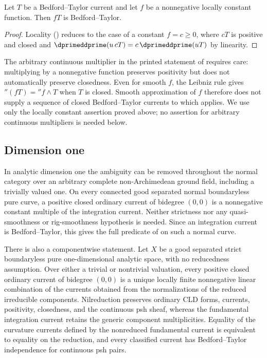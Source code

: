 \begin{corollary}
\label{cor:ch16-bt-times-function}
Let $T$ be a Bedford--Taylor current and let $f$ be a nonnegative locally
constant function.  Then $fT$ is Bedford--Taylor.
\end{corollary}

\begin{proof}
Locality () reduces to the case of a
constant $f=c\geq0$, where $cT$ is positive and closed and
$\dprimeddprime(u\,cT)=c\,\dprimeddprime(uT)$ by linearity.
\end{proof}

The arbitrary continuous multiplier in the printed statement of
\cite[Corollary~8.6.7]{CLD25} requires care: multiplying by a nonnegative
function preserves positivity but does not automatically preserve
closedness.  Even for smooth $f$, the Leibniz rule gives
$\dprime(fT)=\dprime f\wedge T$ when $T$ is closed.  Smooth approximation
of $f$ therefore does not supply a sequence of closed Bedford--Taylor
currents to which  applies.  We use only
the locally constant assertion proved above; no assertion for arbitrary
continuous multipliers is needed below.

\subsection{Dimension one}
\label{sec:ch16-bt-curves}

In analytic dimension one the ambiguity can be removed throughout the normal
category over an arbitrary complete non-Archimedean ground field, including a
trivially valued one.  On every connected good separated normal boundaryless
pure curve, a positive closed ordinary current of bidegree $(0,0)$ is a
nonnegative constant multiple of the integration current.  Neither strictness
nor any quasi-smoothness or rig-smoothness hypothesis is needed.  Since an
integration current is Bedford--Taylor, this gives the full predicate of
\cite[Definition~8.6.2]{CLD25} on such a normal curve.

There is also a componentwise statement.  Let $X$ be a good separated strict
boundaryless pure one-dimensional analytic space, with no reducedness
assumption.  Over either a trivial or nontrivial valuation, every positive
closed ordinary current of bidegree $(0,0)$ is a unique locally finite
nonnegative linear combination of the currents obtained from the
normalizations of the reduced irreducible components.  Nilreduction preserves
ordinary CLD forms, currents, positivity, closedness, and the continuous psh
sheaf, whereas the fundamental integration current retains the generic
component multiplicities.  Equality of the curvature currents defined by the
nonreduced fundamental current is equivalent to equality on the reduction,
and every classified current has Bedford--Taylor independence for continuous
psh pairs.

